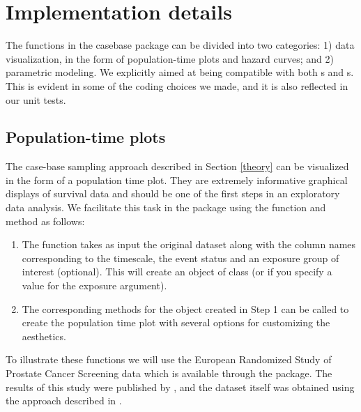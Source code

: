 \documentclass[
]{jss}
\providecommand{\tightlist}{%
  \setlength{\itemsep}{0pt}\setlength{\parskip}{0pt}}
\begin{document}
\hypertarget{implementation-details}{%
\section{Implementation details}\label{implementation-details}}

The functions in the casebase package can be divided into two
categories: 1) data visualization, in the form of population-time plots
and hazard curves; and 2) parametric modeling. We explicitly aimed at
being compatible with both s and s.
This is evident in some of the coding choices we made, and it is also
reflected in our unit tests.

\hypertarget{population-time-plots}{%
\subsection{Population-time plots}\label{population-time-plots}}

The case-base sampling approach described in Section \ref{theory} can be
visualized in the form of a population time plot. They are extremely
informative graphical displays of survival data and should be one of the
first steps in an exploratory data analysis. We facilitate this task in
the  package using the  function and
 method as follows:

\begin{enumerate}
\def\labelenumi{\arabic{enumi}.}
\tightlist
\item
  The  function takes as input the original
  dataset along with the column names corresponding to the timescale,
  the event status and an exposure group of interest (optional). This
  will create an object of class  (or
   if you specify a value for the exposure
  argument).\\
\item
  The corresponding  methods for the object created in Step 1
  can be called to create the population time plot with several options
  for customizing the aesthetics.
\end{enumerate}

To illustrate these functions we will use the European Randomized Study
of Prostate Cancer Screening data which is available through the
 package. The results of this study were published by
\citep{schroder2009screening}, and the dataset itself was obtained using
the approach described in \citep{liu2014recovering}.
\end{document}
